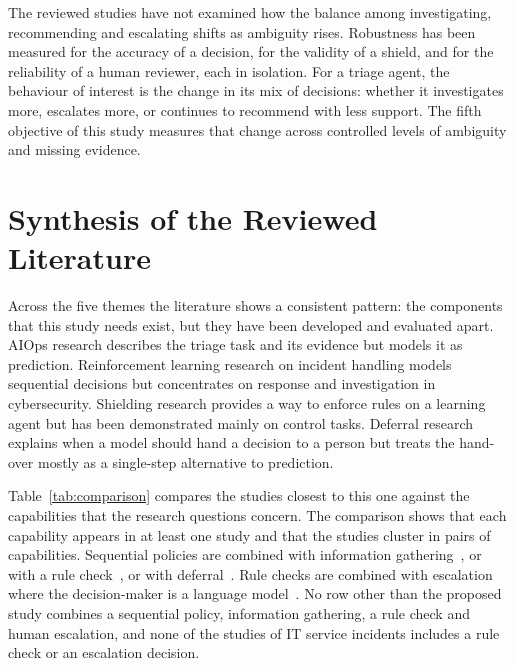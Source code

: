 \documentclass[12pt,a4paper]{article}
\begin{document}
The reviewed studies have not examined how the balance among investigating, recommending and escalating shifts as ambiguity rises. Robustness has been measured for the accuracy of a decision, for the validity of a shield, and for the reliability of a human reviewer, each in isolation. For a triage agent, the behaviour of interest is the change in its mix of decisions: whether it investigates more, escalates more, or continues to recommend with less support. The fifth objective of this study measures that change across controlled levels of ambiguity and missing evidence.

\section{Synthesis of the Reviewed Literature}

Across the five themes the literature shows a consistent pattern: the components that this study needs exist, but they have been developed and evaluated apart. AIOps research describes the triage task and its evidence but models it as prediction. Reinforcement learning research on incident handling models sequential decisions but concentrates on response and investigation in cybersecurity. Shielding research provides a way to enforce rules on a learning agent but has been demonstrated mainly on control tasks. Deferral research explains when a model should hand a decision to a person but treats the hand-over mostly as a single-step alternative to prediction.

Table~\ref{tab:comparison} compares the studies closest to this one against the capabilities that the research questions concern. The comparison shows that each capability appears in at least one study and that the studies cluster in pairs of capabilities. Sequential policies are combined with information gathering~\cite{dunsin2025,kim2025,wang2023hrlhf}, or with a rule check~\cite{alauthman2026}, or with deferral~\cite{zhang2026falcon}. Rule checks are combined with escalation where the decision-maker is a language model~\cite{pacella2026}. No row other than the proposed study combines a sequential policy, information gathering, a rule check and human escalation, and none of the studies of IT service incidents includes a rule check or an escalation decision.
\end{document}
